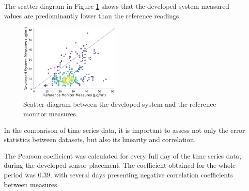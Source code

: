 The scatter diagram in Figure \ref{fig:scatter-measurements} shows that the developed system measured values are predominantly lower than the reference readings.

\setlength{\abovecaptionskip}{10pt plus 0pt minus 0pt}
\begin{figure}[ht]
\centering
\includegraphics[width=0.45\textwidth]{./Images/scatter-measurements.png}
\caption{Scatter diagram between the developed system and the reference monitor measures.}
\label{fig:scatter-measurements}
\end{figure}

In the comparison of time series data, it is important to assess not only the error statistics between datasets, but also its linearity and correlation. 

The Pearson coefficient was calculated for every full day of the time series data, during the developed sensor placement. The coefficient obtained for the whole period was 0.39, with several days presenting negative correlation coefficients between measures.


